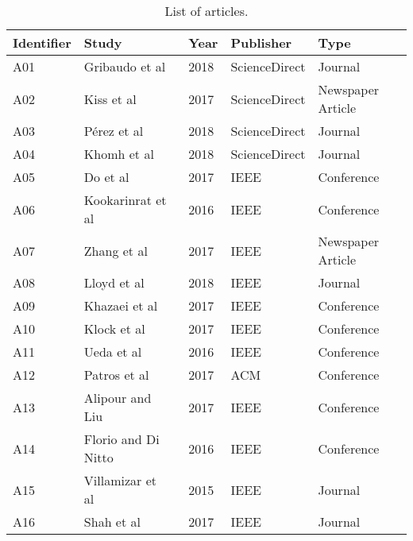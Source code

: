 \begin{table*}[htbp]
\centering
\renewcommand{\arraystretch}{1.5}
\caption{List of articles.}
\label{table_articles}
\begin{tabular}{l@{\hspace{4em}}l@{\hspace{4em}}l@{\hspace{4em}}l@{\hspace{4em}}l}
\hline
Identifier & Study                                                                                                                                                      & Year & Publisher     & Type              \\ \hline
A01 & Gribaudo et al~\cite{Gribaudo2018} & 2018 & ScienceDirect & Journal \\
A02 & Kiss et al~\cite{Kiss2017} & 2017 & ScienceDirect & Newspaper Article \\
A03 & Pérez et al~\cite{Perez2018} & 2018 & ScienceDirect & Journal \\
A04 & Khomh et al~\cite{Khomh2018} & 2018 & ScienceDirect & Journal \\
A05 & Do et al~\cite{Do2017} & 2017 & IEEE & Conference \\
A06 & Kookarinrat et al~\cite{Kookarinrat2016} & 2016 & IEEE & Conference        \\
A07 & Zhang et al~\cite{Zhang2017} & 2017 & IEEE          & Newspaper Article \\
A08 & Lloyd et al~\cite{Lloyd2018} & 2018 & IEEE          & Journal           \\
A09 & Khazaei et al~\cite{Khazaei2017} & 2017 & IEEE          & Conference        \\
A10 & Klock et al~\cite{Klock2017} & 2017 & IEEE          & Conference        \\
A11 & Ueda et al~\cite{Ueda2016} & 2016 & IEEE          & Conference        \\
A12 & Patros et al~\cite{Patros2017} & 2017 & ACM           & Conference        \\
A13 & Alipour and Liu~\cite{Alipour2017} & 2017 & IEEE          & Conference        \\
A14 & Florio and Di Nitto~\cite{Florio2016} & 2016 & IEEE          & Conference        \\
A15 & Villamizar et al~\cite{Villamizar2015} & 2015 & IEEE          & Journal           \\
A16 & Shah et al~\cite{Shah2017} & 2017 & IEEE          & Journal           \\

\end{tabular}
\end{table*}
